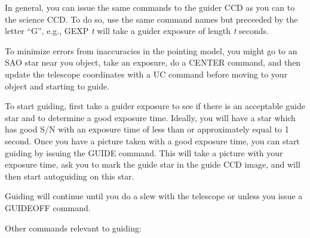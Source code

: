 \documentclass[10pt]{report}
\renewcommand{\[}{\begin{eqnarray}}
\renewcommand{\]}{\end{eqnarray}}
\begin{document}
In general, you can issue the same commands to the guider CCD as you
can to the science CCD. To do so, use the same command names but preceeded
by the letter ``G'', e.g., GEXP \textit{t} will take a guider exposure
of length \textit{t} seconds.

To minimize errors from inaccuracies in the pointing model, you might
go to an SAO star near you object, take an exposure, do a CENTER command,
and then update the telescope coordinates with a UC command before moving
to your object and starting to guide. 

To start guiding, first take a guider exposure to see if there is an
acceptable guide star and to determine a good exposure time. Ideally, you
will have a star which has good S/N with an exposure time of less than
or approximately equal to 1 second. Once you have a picture taken with
a good exposure time, you can start guiding by issuing the GUIDE command.
This will take a picture with your exposure time, ask you to mark the
guide star in the guide CCD image, and will then start autoguiding on
this star. 

Guiding will continue until you do a slew with the telescope or unless
you issue a GUIDEOFF command.

Other commands relevant to guiding:
\end{document}
